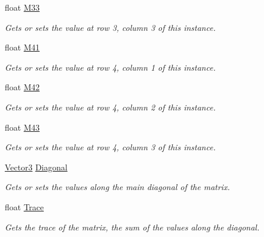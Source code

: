 \begin{DoxyCompactItemize}
float \hyperlink{struct_open_t_k_1_1_matrix4x3_abd2d40897d9bd592b7dd6d17f9a75b4a}{M33}
\begin{DoxyCompactList}\small\item\em Gets or sets the value at row 3, column 3 of this instance. \end{DoxyCompactList}\item 
float \hyperlink{struct_open_t_k_1_1_matrix4x3_a97b7c88adc7bfa3d243873f42a2a9ea9}{M41}
\begin{DoxyCompactList}\small\item\em Gets or sets the value at row 4, column 1 of this instance. \end{DoxyCompactList}\item 
float \hyperlink{struct_open_t_k_1_1_matrix4x3_a18b69d118b277ec4ce117e4f325c083d}{M42}
\begin{DoxyCompactList}\small\item\em Gets or sets the value at row 4, column 2 of this instance. \end{DoxyCompactList}\item 
float \hyperlink{struct_open_t_k_1_1_matrix4x3_a8768acd118f618a60ccbfb6d2d878c33}{M43}
\begin{DoxyCompactList}\small\item\em Gets or sets the value at row 4, column 3 of this instance. \end{DoxyCompactList}\item 
\hyperlink{struct_open_t_k_1_1_vector3}{Vector3} \hyperlink{struct_open_t_k_1_1_matrix4x3_a072d3604ce3b9a51a5c909c6420657eb}{Diagonal}
\begin{DoxyCompactList}\small\item\em Gets or sets the values along the main diagonal of the matrix. \end{DoxyCompactList}\item 
float \hyperlink{struct_open_t_k_1_1_matrix4x3_ac1d64cb2529de61783a6b93e0e7c425d}{Trace}
\begin{DoxyCompactList}\small\item\em Gets the trace of the matrix, the sum of the values along the diagonal. \end{DoxyCompactList}\item 

\end{DoxyCompactItemize}
